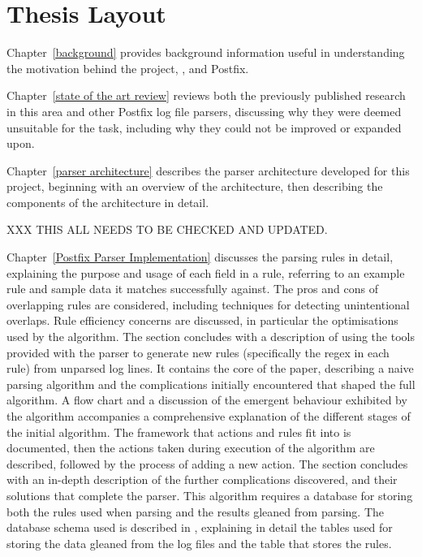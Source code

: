 \section{Thesis Layout}

Chapter~\ref{background} provides background information useful in
understanding the motivation behind the project, , and
Postfix.

Chapter~\ref{state of the art review} reviews both the previously published
research in this area and other Postfix log file parsers, discussing why
they were deemed unsuitable for the task, including why they could not be
improved or expanded upon.

Chapter~\ref{parser architecture} describes the parser architecture
developed for this project, beginning with an overview of the architecture,
then describing the components of the architecture in detail.

XXX THIS ALL NEEDS TO BE CHECKED AND UPDATED\@.

Chapter~\ref{Postfix Parser Implementation} discusses the parsing rules in
detail, explaining the purpose and usage of each field in a rule, referring
to an example rule and sample data it matches successfully against.  The
pros and cons of overlapping rules are considered, including techniques for
detecting unintentional overlaps.  Rule efficiency concerns are discussed,
in particular the optimisations used by the algorithm.  The section
concludes with a description of using the tools provided with the parser to
generate new rules (specifically the regex in each rule) from unparsed log
lines.  It contains the core of the paper, describing a naive parsing
algorithm and the complications initially encountered that shaped the full
algorithm.  A flow chart and a discussion of the emergent behaviour
exhibited by the algorithm accompanies a comprehensive explanation of the
different stages of the initial algorithm.  The framework that actions and
rules fit into is documented, then the actions taken during execution of
the algorithm are described, followed by the process of adding a new
action.  The section concludes with an in-depth description of the further
complications discovered, and their solutions that complete the parser.
This algorithm requires a database for storing both the rules used when
parsing and the results gleaned from parsing.  The database schema used is
described in , explaining in detail the tables
used for storing the data gleaned from the log files and the table that
stores the rules.

